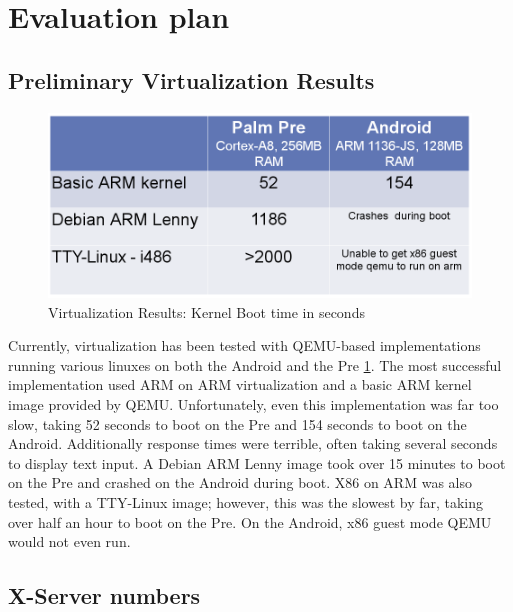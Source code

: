 \section{Evaluation plan}

\subsection{Preliminary Virtualization Results}

\begin{figure}[tbh]
\centering
\includegraphics[width=1.0\columnwidth]{virtualization_results}
\caption{Virtualization Results: Kernel Boot time in seconds}
\label{fig:virt_results}
\end{figure}

Currently, virtualization has been tested with QEMU-based implementations running various linuxes on both the Android and the Pre \ref{fig:virt_results}.  The most successful implementation used ARM on ARM virtualization and a basic ARM kernel image provided by QEMU.  Unfortunately, even this implementation was far too slow, taking 52 seconds to boot on the Pre and 154 seconds to boot on the Android.  Additionally response times were terrible, often taking several seconds to display text input.  A Debian ARM Lenny image took over 15 minutes to boot on the Pre and crashed on the Android during boot.  X86 on ARM was also tested, with a TTY-Linux image; however, this was the slowest by far, taking over half an hour to boot on the Pre.  On the Android, x86 guest mode QEMU would not even run.

\subsection{X-Server numbers}


